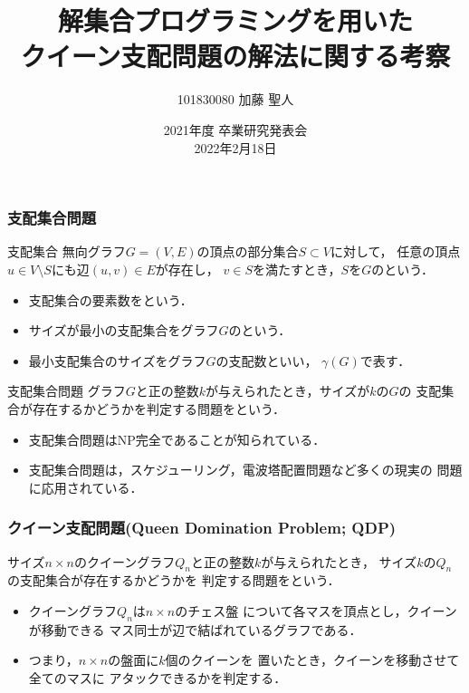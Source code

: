 \documentclass[dvipdfmx,10pt]{beamer}
\begin{document}
\title{解集合プログラミングを用いた\\クイーン支配問題の解法に関する考察}
\author{101830080 \quad 加藤 聖人}
\date{2021年度 卒業研究発表会 \\ 2022年2月18日}

%
%

\begin{frame}\frametitle{}
 \titlepage
\end{frame}

%
%

\begin{frame}\frametitle{支配集合問題}
 \begin{block}{支配集合}
  無向グラフ$G=(V,E)$の頂点の部分集合$S\subset V$に対して，
任意の頂点$u \in V\setminus S$にも辺$(u,v) \in E$が存在し，
$v \in S$を満たすとき，$S$を$G$のという．
  \begin{itemize}
   \item 支配集合の要素数をという．
   \item サイズが最小の支配集合をグラフ$G$のという．
   \item 最小支配集合のサイズをグラフ$G$の\alert{支配数}といい，
$\gamma(G)$で表す．
  \end{itemize}
 \end{block}
 \begin{block}{支配集合問題}
  グラフ$G$と正の整数$k$が与えられたとき，サイズが$k$の$G$の
支配集合が存在するかどうかを判定する問題をという．
  \begin{itemize}
   \item 支配集合問題はNP完全であることが知られている．
   \item 支配集合問題は，スケジューリング，電波塔配置問題など多くの現実の
	 問題に応用されている．
  \end{itemize}
 \end{block}
\end{frame}

%
%

\begin{frame}\frametitle{クイーン支配問題(Queen Domination Problem; QDP)}
 \begin{block}{}
  サイズ$n\times n$のクイーングラフ$Q_n$と正の整数$k$が与えられたとき，
  サイズ$k$の$Q_n$の支配集合が存在するかどうかを
  判定する問題をという．
  \begin{itemize}
   \item クイーングラフ$Q_n$は$n\times n$のチェス盤
	 について各マスを頂点とし，クイーンが移動できる
	 マス同士が辺で結ばれているグラフである．
   \item つまり，$n \times n$の盤面に$k$個のクイーンを
	 置いたとき，クイーンを移動させて全てのマスに
	 アタックできるかを判定する．
  \end{itemize}
 \end{block}
\end{frame}
 
\end{document}
